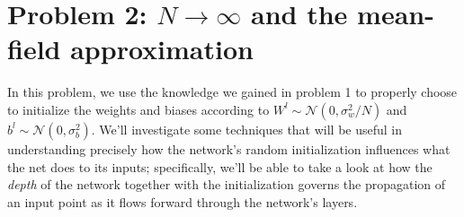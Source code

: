 \documentclass[a4paper]{article}
\begin{document}
\section*{Problem 2: $N\rightarrow\infty$ and the mean-field approximation}

In this problem, we use the knowledge we gained in problem 1 to properly choose to initialize the weights and biases according to $W^l \sim \mathcal{N}(0, \sigma_w^2/N)$ and $b^l \sim \mathcal{N}(0, \sigma_b^2)$. We'll investigate some techniques that will be useful in understanding precisely how the network's random initialization influences what the net does to its inputs; specifically, we'll be able to take a look at how the \textit{depth} of the network together with the initialization governs the propagation of an input point as it flows forward through the network's layers.
\end{document}
